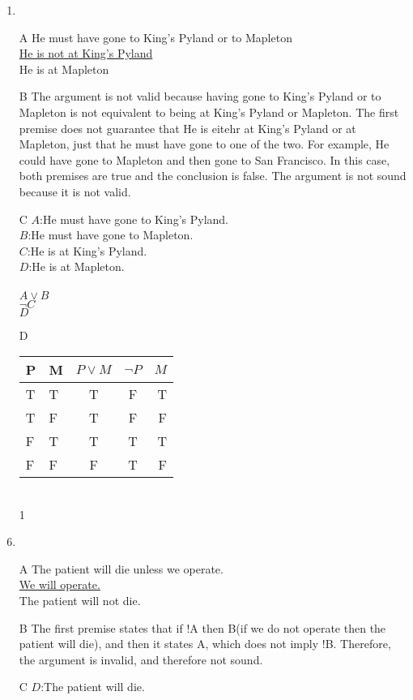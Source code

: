 \documentclass{article}
\begin{document}
\begin{enumerate}
	\item
	\item[A]
		He must have gone to King's Pyland or to Mapleton
		\\\underline{He is not at King's Pyland}
		\\He is at Mapleton
	\item[B]
		The argument is not valid because having gone to King's Pyland or to Mapleton is not equivalent to being at King's Pyland or Mapleton. The first premise does not guarantee that He is eitehr at King's Pyland or at Mapleton, just that he must have gone to one of the two. For example, He could have gone to Mapleton and then gone to San Francisco. In this case, both premises are true and the conclusion is false. The argument is not sound because it is not valid.\\
	\item[C]
		$A$:He must have gone to King's Pyland.\\
		$B$:He must have gone to Mapleton.\\
		$C$:He is at King's Pyland.\\
		$D$:He is at Mapleton.\\
		\\
		$A \lor B$\\
		\underline{$\lnot C$}\\
		$D$
	\item[D]
		\begin{tabular}{l | l || c | c || r}
			P & M & $P \lor M$ & $\lnot P$ & $M$\\ \hline
			T & T & T & F & T\\
			T & F & T & F & F\\
			F & T & T & T & T\\
			F & F & F & T & F\\
		\end{tabular}
		\\1
	\item
	\item[A]
		The patient will die unless we operate.
		\\\underline{We will operate.}
		\\The patient will not die.
	\item[B]
		The first premise states that if !A then B(if we do not operate then the patient will die), and then it states A, which does not imply !B. Therefore, the argument is invalid, and therefore not sound. 
	\item[C]
		$D$:The patient will die.\\

\end{enumerate}
\end{document}
